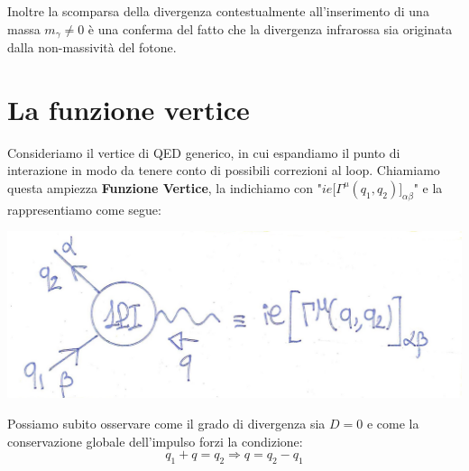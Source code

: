 \documentclass[../main.tex]{subfiles}
\begin{document}
\begin{exercise}
    Inoltre la scomparsa della divergenza contestualmente all'inserimento di una massa $m_\gamma \neq 0$ è una conferma del fatto che la divergenza infrarossa sia originata dalla non-massività del fotone.
    \label{ex:dSigma_dpslashed}
\end{exercise}

\section{La funzione vertice}
Consideriamo il vertice di QED generico, in cui espandiamo il punto di interazione in modo da tenere conto di possibili correzioni al loop. Chiamiamo questa ampiezza \textbf{Funzione Vertice}, la indichiamo con "$ie\bigl[ \Gamma^\mu(q_1,q_2)\bigr]_{\alpha\beta}$" e la rappresentiamo come segue:

\includegraphics[]{images_ch2/vertex_function.jpg}

Possiamo subito osservare come il grado di divergenza sia $D=0$ e come la conservazione globale dell'impulso forzi la condizione:
\[q_1 + q = q_2 \Rightarrow q = q_2 - q_1 \]
\end{document}
